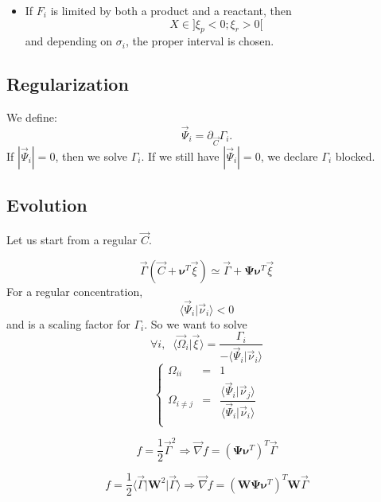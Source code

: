 \documentclass[aps,12pt]{revtex4}
\begin{document}
\begin{itemize}
\begin{itemize}
	\item If $F_i$ is limited by both a product and a reactant, then $$X\in\rbrack \xi_p < 0 ; \xi_r > 0 \lbrack$$
	and depending on $\sigma_i$, the proper interval is chosen.
	\end{itemize}
	
\end{itemize}



 \subsection{Regularization}
We define:
\begin{equation}
\vec{\Psi}_i = \partial_{\vec{C}} \Gamma_i.
\end{equation}
If $|\vec{\Psi}_i|=0$, then we solve $\Gamma_i$. If we still have $|\vec{\Psi}_i|=0$, we declare $\Gamma_i$ blocked.

\subsection{Evolution}
Let us start from a regular $\vec{C}$.

\begin{equation}
	\vec{\Gamma}(\vec{C}+\bm{\nu}^T \vec{\xi}) \simeq \vec{\Gamma} + \bm{\Psi} \bm{\nu}^T \vec{\xi}
\end{equation}
For a regular concentration,
\begin{equation}
	\langle\vec{\Psi}_i \vert \vec{\nu}_i\rangle < 0
\end{equation}
and is a scaling factor for $\Gamma_i$. So we want to solve
\begin{equation}
	\forall i, \;\; \langle \vec{\Omega}_i \vert \vec{\xi} \rangle = \dfrac{\Gamma_i}{-\langle\vec{\Psi}_i \vert \vec{\nu}_i\rangle}
\end{equation}
\begin{equation}
\left\lbrace
	\begin{array}{rcl}
	\Omega_{ii}   & = & 1\\
	\Omega_{i\not=j} & = & \dfrac{\langle\vec{\Psi}_i \vert \vec{\nu}_j\rangle}{\langle\vec{\Psi}_i \vert \vec{\nu}_i\rangle}\\
	\end{array}
\right.
\end{equation}

\begin{equation}
	f = \dfrac{1}{2} \vec{\Gamma}^2 \Rightarrow \vec{\nabla} f = \left(\bm{\Psi} \bm{\nu}^T\right)^T \vec{\Gamma}
\end{equation}

\begin{equation}
	f = \dfrac{1}{2} \langle \vec{\Gamma} \vert \bm{W}^2 \vert \vec{\Gamma} \rangle \Rightarrow \vec{\nabla} f = \left(\bm{W}\bm{\Psi} \bm{\nu}^T\right)^T \bm{W}\vec{\Gamma}
\end{equation}

 
\end{document}
